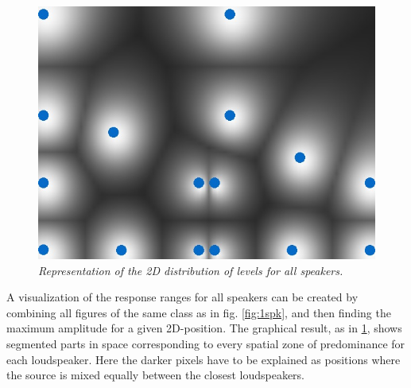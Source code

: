 \documentclass[twoside,10pt]{article}
\begin{document}
\begin{figure}[ht]
\centerline{\includegraphics[scale=0.5]{all_r_6_b_0}}
\caption{{\it Representation of the 2D distribution of levels for all speakers. 
}}  
\label{fig:allspk2}
\end{figure}
A visualization of the response ranges for all speakers can be created by combining all figures of the same class as in fig. \ref{fig:1spk}, and then finding the maximum amplitude for a given 2D-position. The graphical result, as in \ref{fig:allspk2}, shows segmented parts in space corresponding to every spatial zone of predominance for each loudspeaker. Here the darker pixels have to be explained as positions where the source is mixed equally between the closest loudspeakers. %
\end{document}

